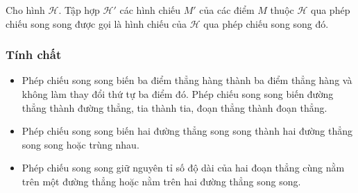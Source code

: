 \begin{tomtat}
\begin{dn}
	Cho hình $\mathcal{H}$. Tập hợp $\mathcal{H}'$ các hình chiếu $M'$ của các điểm $M$ thuộc $\mathcal{H}$ qua phép chiếu song song được gọi là hình chiếu của $\mathcal{H}$ qua phép chiếu song song đó.
\end{dn}
\subsubsection{Tính chất}
\begin{itemize}
	\item Phép chiếu song song biến ba điểm thẳng hàng thành ba điểm thẳng hàng và không làm thay đổi thứ tự ba điểm đó. Phép chiếu song song biến đường thẳng thành đường thẳng, tia thành tia, đoạn thẳng thành đoạn thẳng.
	\item Phép chiếu song song biến hai đường thẳng song song thành hai đường thẳng song song hoặc trùng nhau.
	\item Phép chiếu song song giữ nguyên tỉ số độ dài của hai đoạn thẳng cùng nằm trên một đường thẳng hoặc nằm trên hai đường thẳng song song.
\end{itemize}
\end{tomtat}